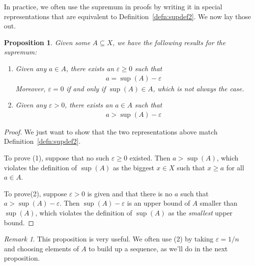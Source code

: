 \documentclass[12pt]{article}
\numberwithin{equation}{section} %
\theoremstyle{plain}
\newtheorem{prop}[thm]{Proposition}
\theoremstyle{definition}
\theoremstyle{remark}
\newtheorem*{rmk}{Remark}
\begin{document}
In practice, we often use the supremum in proofs by writing it in
special representations that are equivalent to
Definition~\ref{defn:supdef2}. We now lay those out.
\begin{prop}
Given some $A\subseteq X$, we have the following results for the
supremum:
\begin{enumerate}
  \item Given any $a\in A$, there exists an $\varepsilon\geq 0$ such
    that
    \begin{align*}
      a = \sup(A) - \varepsilon
    \end{align*}
    Moreover, $\varepsilon=0$ if and only if $\sup(A) \in A$, which is
    not always the case.
  \item Given any $\varepsilon>0$, there exists an $a\in A$ such that
    \begin{align*}
      a > \sup(A) -\varepsilon
    \end{align*}
\end{enumerate}
\end{prop}
\begin{proof}
We just want to show that the two representations above match
Definition~\ref{defn:supdef2}.

To prove (1), suppose that no such $\varepsilon\geq 0$ existed. Then $a
> \sup(A)$, which violates the definition of $\sup(A)$ as the biggest
$x\in X$ such that $x\geq a$ for all $a\in A$.

To prove(2), suppose $\varepsilon>0$ is given and that there is no $a$
such that $a>\sup(A)-\varepsilon$. Then $\sup(A)-\varepsilon$ is an
upper bound of $A$ smaller than $\sup(A)$, which violates the definition
of $\sup(A)$ as the \emph{smallest} upper bound.
\end{proof}
\begin{rmk}
This proposition is very useful. We often use (2) by taking
$\varepsilon=1/n$ and choosing elements of $A$ to build up a sequence,
as we'll do in the next proposition.
\end{rmk}
\end{document}
